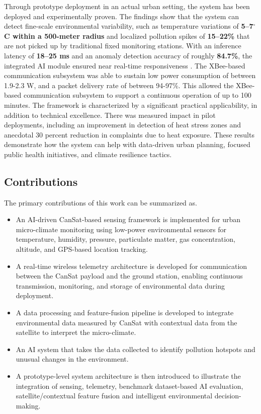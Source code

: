 \documentclass[conference]{IEEEtran}
\begin{document}
Through prototype deployment in an actual urban setting, the system has been deployed and experimentally proven. The findings show that the system can detect fine-scale environmental variability, such as temperature variations of \textbf{5--7$^\circ$C within a 500-meter radius} and localized pollution spikes of \textbf{15--22\%} that are not picked up by traditional fixed monitoring stations. With an inference latency of \textbf{18--25 ms} and an anomaly detection accuracy of roughly \textbf{84.7\%}, the integrated AI module ensured near real-time responsiveness \cite{p3}. The XBee-based communication subsystem was able to sustain low power consumption of between 1.9-2.3 W, and a packet delivery rate of between 94-97\%. This allowed the XBee-based communication subsystem to support a continuous operation of up to 100 minutes. The framework is characterized by a significant practical applicability, in addition to technical excellence. There was measured impact in pilot deployments, including an improvement in detection of heat stress zones and anecdotal 30 percent reduction in complaints due to heat exposure. These results demonstrate how the system can help with data-driven urban planning, focused public health initiatives, and climate resilience tactics.

\subsection{Contributions}

The primary contributions of this work can be summarized as.

\begin{itemize}

\item An AI-driven CanSat-based sensing framework is implemented for urban micro-climate monitoring using low-power environmental sensors for temperature, humidity, pressure, particulate matter, gas concentration, altitude, and GPS-based location tracking.

\item A real-time wireless telemetry architecture is developed for communication between the CanSat payload and the ground station, enabling continuous transmission, monitoring, and storage of environmental data during deployment.

\item A data processing and feature-fusion pipeline is developed to integrate environmental data measured by CanSat with contextual data from the satellite to interpret the micro-climate.

\item An AI system that takes the data collected to identify pollution hotspots and unusual changes in the environment.

\item A prototype-level system architecture is then introduced to illustrate the integration of sensing, telemetry, benchmark dataset-based AI evaluation, satellite/contextual feature fusion and intelligent environmental decision-making.

\end{itemize}
\end{document}
